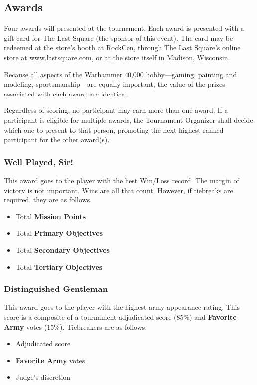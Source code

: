 \documentclass[12pt,titlepage]{article}
\begin{document}
\subsection*{Awards}

Four awards will presented at the tournament. Each award is presented with a gift card for The Last Square (the sponsor of this event). The card may be redeemed at the store's booth at RockCon, through The Last Square's online store at {www.lastsquare.com}, or at the store itself in Madison, Wisconsin.

Because all aspects of the Warhammer 40,000 hobby---gaming, painting and modeling, sportsmanship---are equally important, the value of the prizes associated with each award are identical.

Regardless of scoring, no participant may earn more than one award. If a participant is eligible for multiple awards, the Tournament Organizer shall decide which one to present to that person, promoting the next highest ranked participant for the other award(s).

\subsubsection*{Well Played, Sir!}

This award goes to the player with the best Win/Loss record. The margin of victory is not important, Wins are all that count. However, if tiebreaks are required, they are as follows.

\begin{itemize}
\item Total \textbf{Mission Points}
\item Total \textbf{Primary Objectives}
\item Total \textbf{Secondary Objectives}
\item Total \textbf{Tertiary Objectives}
\end{itemize}

\subsubsection*{Distinguished Gentleman}

This award goes to the player with the highest army appearance rating. This score is a composite of a tournament adjudicated score (85\%) and \textbf{Favorite Army} votes (15\%). Tiebreakers are as follows.

\begin{itemize}
\item Adjudicated score
\item \textbf{Favorite Army} votes
\item Judge's discretion
\end{itemize}
\end{document}
